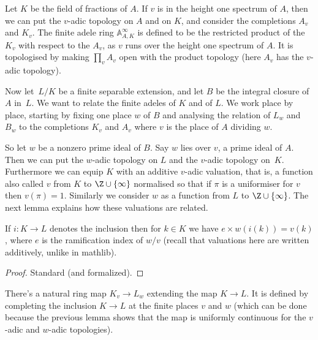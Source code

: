 Let $K$ be the field of fractions of $A$. If $v$ is in the height one spectrum of $A$,
then we can put the $v$-adic topology on $A$ and on $K$, and consider the completions
$A_v$ and $K_v$. The finite adele ring $\mathbb{A}_{A,K}^\infty$ is defined to be
the restricted product of the $K_v$ with respect to the $A_v$, as $v$ runs over
the height one spectrum of $A$. It is topologised by making $\prod_v A_v$ open with
the product topology (here $A_v$ has the $v$-adic topology).

Now let~$L/K$ be a finite separable extension, and let $B$ be the integral closure of~$A$ in~$L$.
We want to relate the finite adeles of $K$ and of $L$. We work place by place, starting by fixing
one place $w$ of $B$ and analysing the relation of $L_w$ and $B_w$ to the completions $K_v$
and $A_v$ where $v$ is the place of $A$ dividing $w$.

So let $w$ be a nonzero prime ideal of $B$. Say $w$ lies over $v$, a prime ideal of $A$.
Then we can put the $w$-adic topology on $L$ and the $v$-adic topology on~$K$. Furthermore
we can equip $K$ with an additive $v$-adic valuation, that is,
a function also called $v$ from $K$ to $\Z\cup\{\infty\}$ normalised so that if $\pi$ is a uniformiser
for $v$ then $v(\pi)=1$. Similarly we consider $w$ as a function from $L$ to $\Z\cup\{\infty\}$.
The next lemma explains how these valuations are related.

\begin{lemma}
  \label{IsDedekindDomain.HeightOneSpectrum.valuation_comap}
  \leanok
  If $i:K\to L$ denotes the inclusion then for $k\in K$ we have
  $e\times w(i(k))=v(k)$, where $e$ is the ramification index of $w/v$
  (recall that valuations here are written additively, unlike in mathlib).
\end{lemma}
\begin{proof}
  \leanok
  Standard (and formalized).
\end{proof}

\begin{definition}
  \label{IsDedekindDomain.HeightOneSpectrum.Extension.adicCompletionSemialgHom}
  \leanok
  There's a natural ring map $K_v\to L_w$ extending the map $K\to L$.
  It is defined by completing
  the inclusion $K\to L$ at the finite places $v$ and $w$ (which can be done
  because the previous lemma shows that the map is uniformly continuous for the $v$-adic
  and $w$-adic topologies).
\end{definition}

